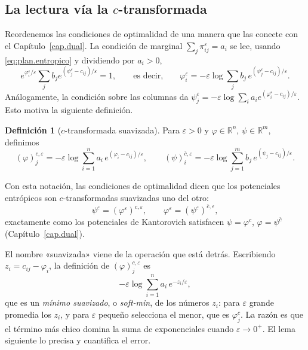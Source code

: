 \documentclass[12pt, a4paper]{amsbook}
\newcommand{\R}{{\mathbb R}}
\theoremstyle{remark}
\theoremstyle{definition}
\newtheorem{defi}[teo]{Definición}
\numberwithin{section}{chapter}
\numberwithin{subsection}{section}
\numberwithin{equation}{section}
\numberwithin{figure}{chapter}
\begin{document}
\subsection*{La lectura vía la $c$-transformada}

Reordenemos las condiciones de optimalidad de una manera que las conecte con
el Capítulo~\ref{cap.dual}. La condición de marginal $\sum_j\pi^\varepsilon_{ij}=a_i$
se lee, usando \eqref{eq:plan.entropico} y dividiendo por $a_i>0$,
\[
e^{\varphi^\varepsilon_i/\varepsilon}\sum_jb_je^{(\psi^\varepsilon_j-c_{ij})/\varepsilon}=1,
\qquad\text{es decir,}\qquad
\varphi^\varepsilon_i=-\varepsilon\log\sum_jb_j\,e^{(\psi^\varepsilon_j-c_{ij})/\varepsilon}.
\]
Análogamente, la condición sobre las columnas da
$\psi^\varepsilon_j=-\varepsilon\log\sum_ia_ie^{(\varphi^\varepsilon_i-c_{ij})/\varepsilon}$.
Esto motiva la siguiente definición.

\begin{defi}[$c$-transformada suavizada]\label{def.softmin}
Para $\varepsilon>0$ y $\varphi\in\R^n$, $\psi\in\R^m$, definimos
\[
(\varphi)^{c,\varepsilon}_j=-\varepsilon\log\sum_{i=1}^na_i\,e^{(\varphi_i-c_{ij})/\varepsilon},
\qquad
(\psi)^{\bar c,\varepsilon}_i=-\varepsilon\log\sum_{j=1}^mb_j\,e^{(\psi_j-c_{ij})/\varepsilon}.
\]
\end{defi}

Con esta notación, las condiciones de optimalidad dicen que los potenciales
entrópicos son $c$-transformadas suavizadas uno del otro:
\begin{equation}\label{eq:ctransf.eps}
\psi^\varepsilon=(\varphi^\varepsilon)^{c,\varepsilon},
\qquad
\varphi^\varepsilon=(\psi^\varepsilon)^{\bar c,\varepsilon},
\end{equation}
exactamente como los potenciales de Kantorovich satisfacen $\psi=\varphi^c$,
$\varphi=\psi^{\bar c}$ (Capítulo~\ref{cap.dual}).

El nombre «suavizada» viene de la operación que está detrás. Escribiendo
$z_i=c_{ij}-\varphi_i$, la definición de $(\varphi)^{c,\varepsilon}_j$ es
\[
-\varepsilon\log\sum_{i=1}^na_i\,e^{-z_i/\varepsilon},
\]
que es un \emph{mínimo suavizado}, o \emph{soft-min}, de los números $z_i$:
para $\varepsilon$ grande promedia los $z_i$, y para $\varepsilon$ pequeño
selecciona el menor, que es $\varphi^c_j$. La razón es que el término más
chico domina la suma de exponenciales cuando $\varepsilon\to0^+$. El lema
siguiente lo precisa y cuantifica el error.
\end{document}
